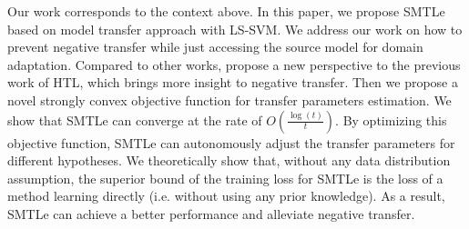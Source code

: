Our work corresponds to the context above. In this paper, we propose SMTLe based on model transfer approach with LS-SVM. We address our work on how to prevent negative transfer while just accessing the source model for domain adaptation. Compared to other works, propose a new perspective to the previous work of HTL, which brings more insight to negative transfer. Then we propose a novel strongly convex objective function for transfer parameters estimation. We show that SMTLe can converge at the rate of $O(\frac{\log(t)}{t})$. 
By optimizing this objective function, SMTLe can autonomously adjust the transfer parameters for different hypotheses. We theoretically show that, without any data distribution assumption, the superior bound of the training loss for SMTLe is the loss of a method learning directly (i.e. without using any prior knowledge). As a result, SMTLe can achieve a better performance and alleviate negative transfer.
